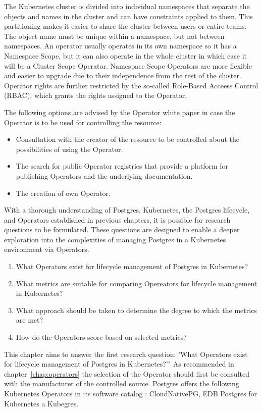 The Kubernetes cluster is divided into individual namespaces that separate the objects and names in the cluster and can have constraints applied to them. This partitioning makes it easier to share the cluster between users or entire teams. The object name must be unique within a namespace, but not between namespaces.  An operator usually operates in its own namespace so it has a Namespace Scope, but it can also operate in the whole cluster in which case it will be a Cluster Scope Operator. Namespace Scope Operators are more flexible and easier to upgrade due to their independence from the rest of the cluster. Operator rights are further restricted by the so-called Role-Based Acceess Control (RBAC), which grants the rights assigned to the Operator. \cite{ OperatorsAtK8sIface}

The following options are advised by the Operator white paper \cite{OperatorWhitepaper} in case the Operator is to be used for controlling the resource:
\begin{itemize}
  \item	Consultation with the creator of the resource to be controlled about the possibilities of using the Operator.
  \item	The search for public Operator registries that provide a platform for publishing Operators and the underlying documentation.
  \item	The creation of own Operator.
\end{itemize}

With a thorough understanding of Postgres, Kubernetes, the Postgres lifecycle, and Operators established in previous chapters, it is possible for research questions to be formulated. These questions are designed to enable a deeper exploration into the complexities of managing Postgres in a Kubernetes environment via Operators.

\begin{enumerate}
  \item What Operators exist for lifecycle management of Postgres in Kubernetes?
  \item What metrics are suitable for comparing Opereators for lifecycle management in Kubernetes?
  \item What approach should be taken to determine the degree to which the metrics are met?
  \item How do the Operators score based on selected metrics?
\end{enumerate}

\label{chap:searchForOperators}
This chapter aims to answer the first research question: 'What Operators exist for lifecycle management of Postgres in Kubernetes?'"
As recommended in chapter~\ref{chap:operators} the selection of the Operator should first be consulted with the manufacturer of the controlled source. Postgres offers the following Kubernetes Operators in its software catalog \cite{docuPgSwCatalogue}: CloudNativePG, EDB Postgres for Kubernetes a Kubegres.

